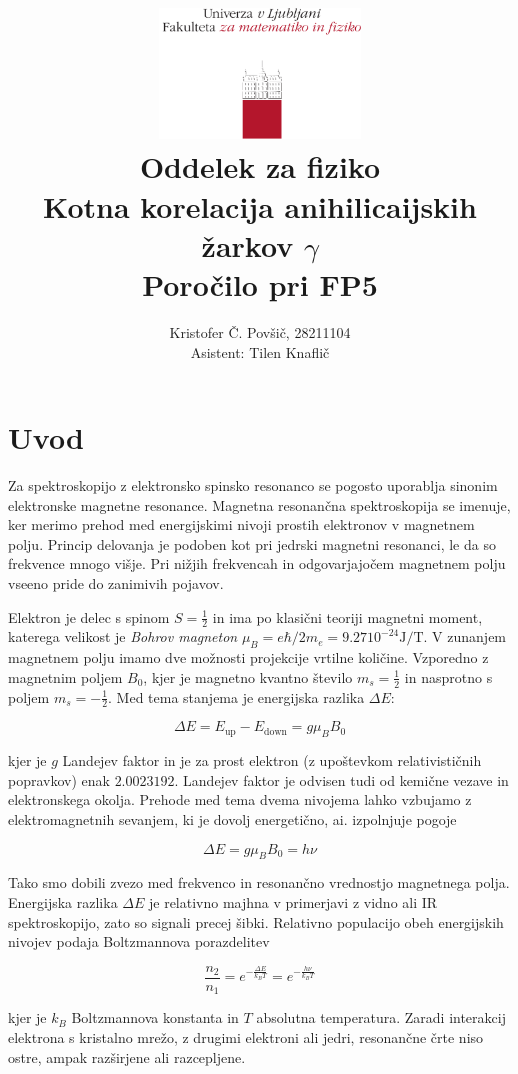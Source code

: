 \documentclass[11pt]{article}
\title{
  \includegraphics[width=0.4\textwidth]{fmf_logo}\\
  {\small Oddelek za fiziko} \\
  {Kotna korelacija anihilicaijskih žarkov $\gamma$}\\
  {\small Poročilo pri FP5}\\
}
\date{}
\author{ Kristofer Č. Povšič, 28211104 \\[5 cm]
 \small  Asistent: Tilen Knaflič \\
}
\begin{document}
\maketitle
\tableofcontents

\section{Uvod}\label{sec:org2f7b62e}
Za spektroskopijo z elektronsko spinsko resonanco se pogosto uporablja sinonim elektronske magnetne resonance. Magnetna resonančna spektroskopija se imenuje, ker merimo prehod med energijskimi nivoji prostih elektronov v magnetnem polju. Princip delovanja je podoben kot pri jedrski magnetni resonanci, le da so frekvence mnogo višje. Pri nižjih frekvencah in odgovarjajočem magnetnem polju vseeno pride do zanimivih pojavov.

Elektron je delec s spinom \(S = \frac{1}{2}\) in ima po klasični teoriji magnetni moment, katerega velikost je \emph{Bohrov magneton} \(\mu_B = e \hbar/ 2 m_e = 9.27 10^{-24} \mathrm{J} / \mathrm{T}\). V zunanjem magnetnem polju imamo dve možnosti projekcije vrtilne količine. Vzporedno z magnetnim poljem \(B_0\), kjer je magnetno kvantno število \(m_s = \frac{1}{2}\) in nasprotno s poljem \(m_s = - \frac{1}{2}\). Med tema stanjema je energijska razlika \(\Delta E\):

\[ \Delta E = E_{\text{up}} - E_{\text{down}} = g \mu_B B_0
\]

kjer je \(g\) Landejev faktor in je za prost elektron (z upoštevkom relativističnih popravkov) enak \(2.0023192\). Landejev faktor je odvisen tudi od kemične vezave in elektronskega okolja. Prehode med tema dvema nivojema lahko vzbujamo z elektromagnetnih sevanjem, ki je dovolj energetično, ai. izpolnjuje pogoje

\[ \Delta E = g \mu_B B_0 = h \nu
\]

Tako smo dobili zvezo med frekvenco in resonančno vrednostjo magnetnega polja. Energijska razlika \(\Delta E\) je relativno majhna v primerjavi z vidno ali IR spektroskopijo, zato so signali precej šibki. Relativno populacijo obeh energijskih nivojev podaja Boltzmannova porazdelitev

\[ \frac{n_2}{n_1} = e ^{- \frac{\Delta E}{k_B T}} = e ^{- \frac{h \nu}{k_B T}}
\]

kjer je \(k_B\) Boltzmannova konstanta in \(T\) absolutna temperatura. Zaradi interakcij elektrona s kristalno mrežo, z drugimi elektroni ali jedri, resonančne črte niso ostre, ampak razširjene ali razcepljene.
\end{document}
